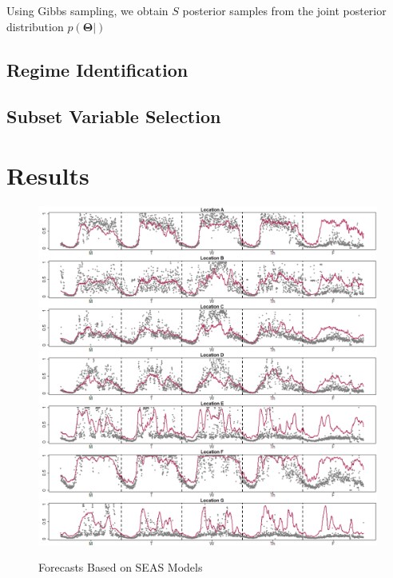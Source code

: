 Using Gibbs sampling, we obtain $S$ posterior samples from the joint posterior distribution $p(\bm{\Theta}|)$

\subsection{Regime Identification}
\label{sec:stage2}



\subsection{Subset Variable Selection}
\label{sec:stage3}











\section{Results}

\begin{figure}[htbp]
\caption{Forecasts Based on SEAS Models}
\includegraphics[width=\textwidth]{SEASESTPlots}
\label{fig:SEASESTPlots}
\end{figure}


